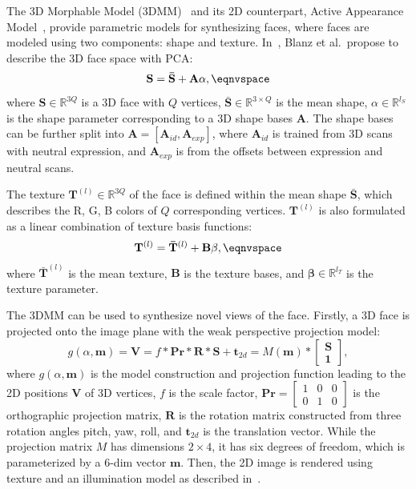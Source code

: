 \label{sec:alg}

The 3D Morphable Model (3DMM)~\cite{blanz1999morphable} and its 2D counterpart, Active Appearance Model~\cite{cootes2001active,face-model-fitting-on-low-resolution-images}, provide parametric models for synthesizing faces, where faces are modeled using two components: shape and texture. 
In~\cite{blanz1999morphable}, Blanz et al.~propose to describe the 3D face space with PCA:
\begin{equation}
\mathbf{S} = \mathbf{\bar{S}} +  \mathbf{A} \mathbf{\alpha},
\eqnvspace
\end{equation}
where $\mathbf{S}\in\mathbb{R}^{3Q}$ is a 3D face with $Q$ vertices, $\mathbf{\bar{S}}\in\mathbb{R}^{3\times Q}$ is the mean shape, $\alpha\in\mathbb{R}^{l_S}$ is the shape parameter corresponding to a 3D shape bases $\mathbf{A}$. 
%
The shape bases can be further split into $\mathbf{A} = [\mathbf{A}_{id}, \mathbf{A}_{exp}]$, where $\mathbf{A}_{id}$ is trained from 3D scans with neutral expression, and $\mathbf{A}_{exp}$ is from the offsets between expression and neutral scans.

The texture $\mathbf{T}^{(l)}\in\mathbb{R}^{3Q}$ of the face is defined within the mean shape $\mathbf{\bar{S}}$, which describes the R, G, B colors of $Q$  corresponding vertices.
$\mathbf{T}^{(l)}$ is also formulated as a linear combination of texture basis functions:
\begin{equation}
\mathbf{T}^{(l)} = \mathbf{\bar{T}}^{(l)} + \mathbf{B} \mathbf{\beta},
\eqnvspace
\end{equation}
where $\mathbf{\bar{T}}^{(l)}$ is the mean texture, $\mathbf{B}$ is the texture bases, and $\mathbf{\beta}\in\mathbb{R}^{l_T}$ is the texture parameter.

The 3DMM can be used to synthesize novel views of the face. 
Firstly, a 3D face is projected onto the image plane with the weak perspective projection model:
\begin{equation}
g(\alpha, \mathbf{m})= \mathbf{V} = f \ast \mathbf{Pr}\ast\mathbf{R}\ast\mathbf{S}+\mathbf{t}_{2d} =  M(\mathbf{m}) \ast \begin{bmatrix} \mathbf{S} \\ \mathbf{1} \end{bmatrix},
\label{eqn:projection}
\end{equation}
where $g(\alpha, \mathbf{m})$ is the model construction and projection function leading to the 2D positions $\mathbf{V}$ of 3D vertices, $f$ is the scale factor, 
$\mathbf{Pr} = \begin{bmatrix} 1 & 0 & 0 \\ 0 & 1 & 0 \end{bmatrix} $ is the orthographic projection matrix,
$\mathbf{R}$ is the rotation matrix constructed from three rotation angles pitch, yaw, roll, and $\mathbf{t}_{2d}$ is the translation vector. 
While the projection matrix $M$ has dimensions $2 \times 4$, it has six degrees of freedom, which is parameterized by a $6$-dim vector $\mathbf{m}$. 
%
Then, the 2D image is rendered using texture and an illumination model as described in~\cite{blanz1999morphable}.

